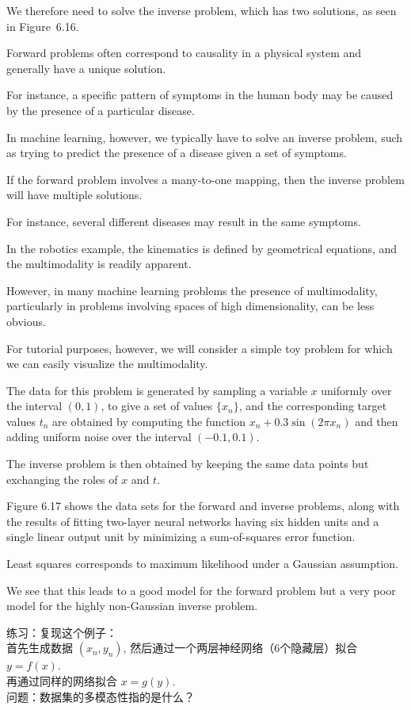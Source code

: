 \documentclass{article}
\begin{document}
We therefore need to solve the inverse problem, which has two solutions, as seen in Figure~6.16.

Forward problems often correspond to causality in a physical system and generally have a unique solution. 

For instance, a specific pattern of symptoms in the human body may be caused by the presence of a particular disease. 

In machine learning, however, we typically have to solve an inverse problem, such as trying to predict the presence of a disease given a set of symptoms. 

If the forward problem involves a many-to-one mapping, then the inverse problem will have multiple solutions. 

For instance, several different diseases may result in the same symptoms.

In the robotics example, the kinematics is defined by geometrical equations, and the multimodality is readily apparent. 

However, in many machine learning problems the presence of multimodality, particularly in problems involving spaces of high dimensionality, can be less obvious. 

For tutorial purposes, however, we will consider a simple toy problem for which we can easily visualize the multimodality. 

The data for this problem is generated by sampling a variable $x$ uniformly over the interval $(0,1)$, to give a set of values $\{x_n\}$, and the corresponding target values $t_n$ are obtained by computing the function $x_n + 0.3\sin(2\pi x_n)$ and then adding uniform noise over the interval $(-0.1,0.1)$. 

The inverse problem is then obtained by keeping the same data points but exchanging the roles of $x$ and $t$. 

Figure 6.17 shows the data sets for the forward and inverse problems, along with the results of fitting two-layer neural networks having six hidden units and a single linear output unit by minimizing a sum-of-squares error function. 

Least squares corresponds to maximum likelihood under a Gaussian assumption. 

We see that this leads to a good model for the forward problem but a very poor model for the highly non-Gaussian inverse problem.

{\color{red}
练习：复现这个例子：\\
首先生成数据 $(x_n,y_n)$, 然后通过一个两层神经网络（6个隐藏层）拟合 $y=f(x)$. \\
再通过同样的网络拟合 $x=g(y)$. \\
问题：数据集的多模态性指的是什么？
}
\end{document}

